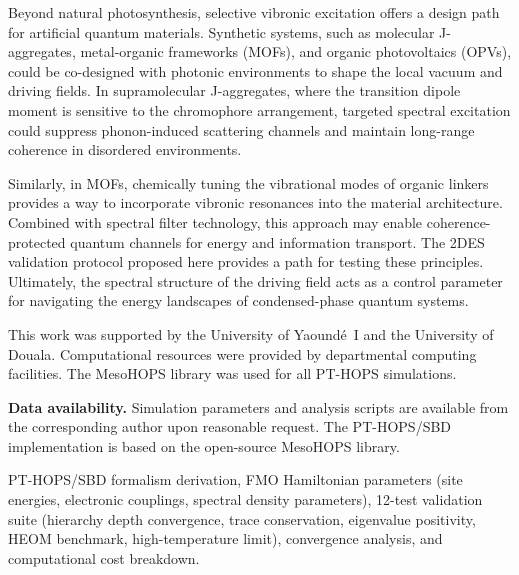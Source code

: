\documentclass[journal=jpcl,manuscript=letter]{achemso}
\begin{document}
Beyond natural photosynthesis, selective vibronic excitation offers a design path for artificial quantum materials. Synthetic systems, such as molecular J-aggregates, metal-organic frameworks (MOFs), and organic photovoltaics (OPVs), could be co-designed with photonic environments to shape the local vacuum and driving fields. In supramolecular J-aggregates, where the transition dipole moment is sensitive to the chromophore arrangement, targeted spectral excitation could suppress phonon-induced scattering channels and maintain long-range coherence in disordered environments.

Similarly, in MOFs, chemically tuning the vibrational modes of organic linkers provides a way to incorporate vibronic resonances into the material architecture. Combined with spectral filter technology, this approach may enable coherence-protected quantum channels for energy and information transport. The 2DES validation protocol proposed here provides a path for testing these principles. Ultimately, the spectral structure of the driving field acts as a control parameter for navigating the energy landscapes of condensed-phase quantum systems.


\begin{acknowledgement}
This work was supported by the University of Yaoundé~I and the University of Douala. Computational resources were provided by departmental computing facilities. The MesoHOPS library was used for all PT-HOPS simulations.
\end{acknowledgement}


\textbf{Data availability.} Simulation parameters and analysis scripts are available from the corresponding author upon reasonable request. The PT-HOPS/SBD
implementation is based on the open-source MesoHOPS library.


\begin{suppinfo}
PT-HOPS/SBD formalism derivation, FMO Hamiltonian parameters (site energies, electronic couplings, spectral density parameters), 12-test validation suite (hierarchy depth convergence, trace conservation, eigenvalue positivity, HEOM benchmark, high-temperature limit), convergence analysis, and computational cost breakdown.
\end{suppinfo}



\end{document}
